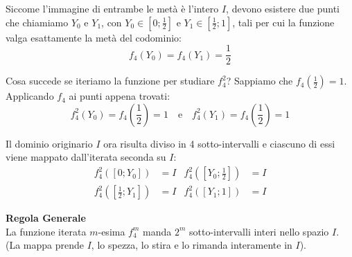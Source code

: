 \documentclass[openany]{book}
\theoremstyle{definition}
\theoremstyle{remark}
\begin{document}
Siccome l'immagine di entrambe le metà è l'intero $I$, devono esistere due punti che chiamiamo $Y_0$ e $Y_1$, con $Y_0 \in \left[0; \frac{1}{2}\right]$ e $Y_1 \in \left[\frac{1}{2}; 1\right]$, tali per cui la funzione valga esattamente la metà del codominio:
$$ f_4(Y_0) = f_4(Y_1) = \frac{1}{2} $$

\begin{center}

\end{center}

Cosa succede se iteriamo la funzione per studiare $f_4^2$? 
Sappiamo che $f_4\left(\frac{1}{2}\right) = 1$. Applicando $f_4$ ai punti appena trovati:
$$ f_4^2(Y_0) = f_4\left(\frac{1}{2}\right) = 1 \quad \text{e} \quad f_4^2(Y_1) = f_4\left(\frac{1}{2}\right) = 1 $$

Il dominio originario $I$ ora risulta diviso in 4 sotto-intervalli e ciascuno di essi viene mappato dall'iterata seconda su $I$:
\begin{align*}
    f_4^2([0; Y_0]) &= I & f_4^2\left(\left[Y_0; \frac{1}{2}\right]\right) &= I \\
    f_4^2\left(\left[\frac{1}{2}; Y_1\right]\right) &= I & f_4^2([Y_1; 1]) &= I
\end{align*}

\textbf{Regola Generale}\\
La funzione iterata $m$-esima $f_4^m$ manda $2^m$ sotto-intervalli interi nello spazio $I$. \\
(La mappa prende $I$, lo spezza, lo stira e lo rimanda interamente in $I$).
\end{document}
